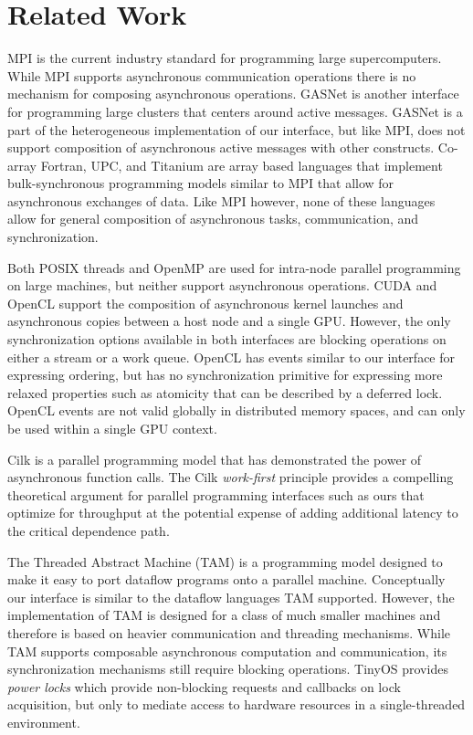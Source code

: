 
\section{Related Work}
\label{sec:related}

MPI is the current industry standard for programming large
super\-computers\cite{MPI}.  While MPI supports asynchronous
communication operations there is no mechanism for composing
asynchronous operations.  GASNet is another interface for programming
large clusters that centers around active messages\cite{GASNET07}.  GASNet
is a part of the heterogeneous implementation of our interface, but like
MPI, does not support composition of asynchronous active messages with
other constructs.  Co-array Fortran, UPC, and Titanium
are array based languages that implement bulk-synchronous
programming models similar to MPI that allow for asynchronous
exchanges of data\cite{COARRAY_FORTRAN,UPC99,JV:Yel98}.  Like
MPI however, none of these languages allow for general composition
of asynchronous tasks, communication, and synchronization.

Both POSIX threads and OpenMP\cite{OPENMP98} are used for intra-node parallel
programming on large machines, but neither support asynchronous
operations.  CUDA\cite{CUDA} and OpenCL\cite{Khronos:OpenCL} support
the composition of asynchronous kernel launches and asynchronous copies
between a host node and a single GPU.  However, the only synchronization
options available in both interfaces are blocking operations on either
a stream or a work queue.  OpenCL has events similar to our interface for
expressing ordering, but has no synchronization primitive for expressing
more relaxed properties such as atomicity that can be described by a
deferred lock.  OpenCL events are not valid globally in distributed memory
spaces, and can only be used within a single GPU context.

Cilk is a parallel programming model that has demonstrated the power of
asynchronous function calls\cite{CILK95}.  The Cilk {\em work-first}
principle provides a compelling theoretical argument for parallel programming
interfaces such as ours that optimize for throughput at the potential
expense of adding additional latency to the critical 
dependence path\cite{Frigo98}.

The Threaded Abstract Machine (TAM) is a programming model designed to
make it easy to port dataflow programs onto a parallel machine\cite{CullerGSvE93}.  
Conceptually our interface is similar to the dataflow languages TAM supported.
However, the implementation of TAM is designed for a class of much smaller machines
and therefore is based on heavier communication and threading mechanisms.
While TAM supports composable asynchronous computation and communication, its
synchronization mechanisms still require blocking operations. TinyOS\cite{PowerLock}
provides {\em power locks} which provide non-blocking requests and callbacks on lock
acquisition, but only to mediate access to hardware resources in a single-threaded
environment.


